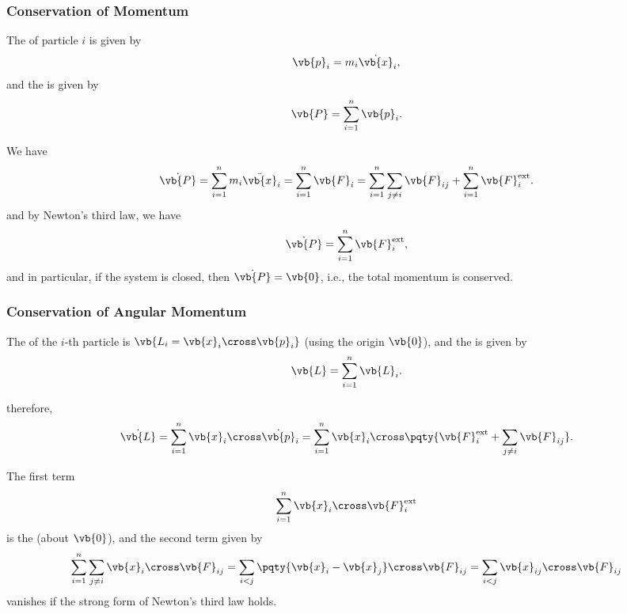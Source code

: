 \subsubsection{Conservation of Momentum}

The  of particle \(i\) is given by
\begin{equation}
    \vb{p}_i = m_i \dot{\vb{x}}_i,
\end{equation}
and the  is given by
\begin{equation}
    \vb{P} = \sum_{i = 1}^{n} \vb{p}_i.
\end{equation}

We have
\begin{equation}
    \dot{\vb{P}} = \sum_{i = 1}^{n} m_i \ddot{\vb{x}}_i = \sum_{i = 1}^{n} \vb{F}_i = \sum_{i = 1}^{n} \sum_{j \neq i} \vb{F}_{ij} + \sum_{i = 1}^{n} \vb{F}_i^{\text{ext}}.
\end{equation}
and by Newton's third law, we have
\begin{equation}
    \dot{\vb{P}} = \sum_{i = 1}^{n} \vb{F}_i^{\text{ext}},
\end{equation}
and in particular, if the system is closed, then \(\dot{\vb{P}} = \vb{0}\), i.e., the total momentum is conserved.

\subsubsection{Conservation of Angular Momentum}
The  of the \(i\)-th particle is \(\vb{L_i = \vb{x}_i \cross \vb{p}_i}\) (using the origin \(\vb{0}\)), and the  is given by
\begin{equation}
    \vb{L} = \sum_{i = 1}^{n} \vb{L}_i.
\end{equation}

therefore,
\begin{equation}
    \dot{\vb{L}} = \sum_{i = 1}^{n} \vb{x}_i \cross \dot{\vb{p}}_i = \sum_{i = 1}^{n} \vb{x}_i \cross \pqty{\vb{F}_i^{\text{ext}} + \sum_{j \neq i} \vb{F}_{ij}}.
\end{equation}

The first term
\begin{equation}
    \sum_{i = 1}^{n} \vb{x}_i \cross \vb{F}_i^{\text{ext}}
\end{equation}
is the  (about \(\vb{0}\)), and the second term given by
\begin{equation}
    \sum_{i = 1}^{n} \sum_{j \neq i} \vb{x}_i \cross \vb{F}_{ij} = \sum_{i < j} \pqty{\vb{x}_i - \vb{x}_j} \cross \vb{F}_{ij} = \sum_{i < j} \vb{x}_{ij} \cross \vb{F}_{ij}
\end{equation}
vanishes if the strong form of Newton's third law holds.

